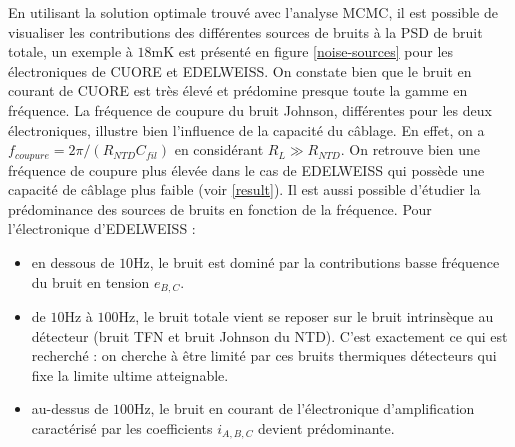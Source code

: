 En utilisant la solution optimale trouvé avec l'analyse MCMC, il est possible de visualiser les contributions des différentes sources de bruits à la PSD de bruit totale, un exemple à $18$mK est présenté en figure \ref{noise-sources} pour les électroniques de CUORE et EDELWEISS. On constate bien que le bruit en courant de CUORE est très élevé et prédomine presque toute la gamme en fréquence. La fréquence de coupure du bruit Johnson, différentes pour les deux électroniques, illustre bien l'influence de la capacité du câblage. En effet, on a $f_{coupure} = 2\pi/(R_{NTD} C_{fil})$ en considérant $R_L\gg R_{NTD}$. On retrouve bien une fréquence de coupure plus élevée dans le cas de EDELWEISS qui possède une capacité de câblage plus faible (voir \ref{result}). Il est aussi possible d'étudier la prédominance des sources de bruits en fonction de la fréquence. Pour l'électronique d'EDELWEISS :
\begin{itemize}
\item en dessous de $10$Hz, le bruit est dominé par la contributions basse fréquence du bruit en tension $e_{B,C}$.
\item de $10$Hz à $100$Hz, le bruit totale vient se reposer sur le bruit intrinsèque au détecteur (bruit TFN et bruit Johnson du NTD). C'est exactement ce qui est recherché : on cherche à être limité par ces bruits thermiques détecteurs qui fixe la limite ultime atteignable.
\item au-dessus de $100$Hz, le bruit en courant de l'électronique d'amplification caractérisé par les coefficients $i_{A,B,C}$ devient prédominante.
\end{itemize} 

